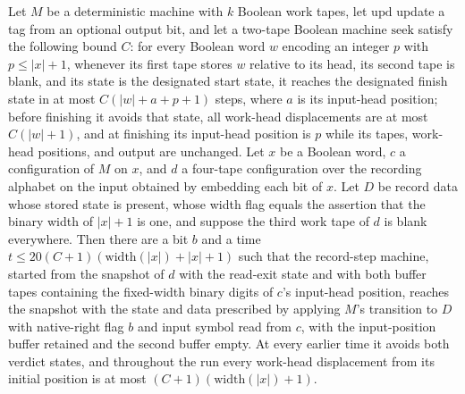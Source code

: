 \begin{theorem}
\label{Turing.recordStep_live_native}
\leanok
{}
Let $M$ be a deterministic machine with $k$ Boolean work tapes, let $\mathrm{upd}$
update a tag from an optional output bit, and let a two-tape Boolean machine
$\mathrm{seek}$ satisfy the following bound $C$: for every Boolean word $w$ encoding an
integer $p$ with $p\le |x|+1$, whenever its first tape stores $w$ relative to its head,
its second tape is blank, and its state is the designated start state, it reaches the
designated finish state in at most $C(|w|+a+p+1)$ steps, where $a$ is its input-head
position; before finishing it avoids that state, all work-head displacements are at most
$C(|w|+1)$, and at finishing its input-head position is $p$ while its tapes, work-head
positions, and output are unchanged. Let $x$ be a Boolean word, $c$ a configuration of
$M$ on $x$, and $d$ a four-tape configuration over the recording alphabet on the input
obtained by embedding each bit of $x$. Let $D$ be record data whose stored state is
present, whose width flag equals the assertion that the binary width of $|x|+1$ is one,
and suppose the third work tape of $d$ is blank everywhere. Then there are a bit $b$ and
a time $t\le 20(C+1)(\mathrm{width}(|x|)+|x|+1)$ such that the record-step machine,
started from the snapshot of $d$ with the read-exit state and with both buffer tapes
containing the fixed-width binary digits of $c$'s input-head position, reaches the
snapshot with the state and data prescribed by applying $M$'s transition to $D$ with
native-right flag $b$ and input symbol read from $c$, with the input-position buffer
retained and the second buffer empty. At every earlier time it avoids both verdict
states, and throughout the run every work-head displacement from its initial position is
at most $(C+1)(\mathrm{width}(|x|)+1)$.
\end{theorem}

